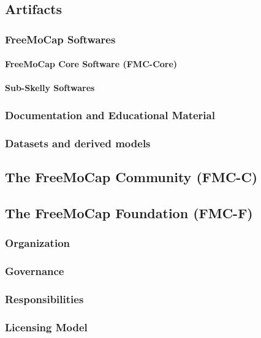 \documentclass[11pt]{article}
\begin{document}
\subsection{Artifacts}

\subsubsection{FreeMoCap Softwares}
\paragraph{FreeMoCap Core Software (FMC-Core)}
\paragraph{Sub-Skelly Softwares}

\subsubsection{Documentation and Educational Material}

\subsubsection{Datasets and derived models}


\subsection{The FreeMoCap Community (FMC-C)}

\subsection{The FreeMoCap Foundation (FMC-F)}
\subsubsection{Organization}
\subsubsection{Governance}
\subsubsection{Responsibilities}
\subsubsection{Licensing Model}
\end{document}
